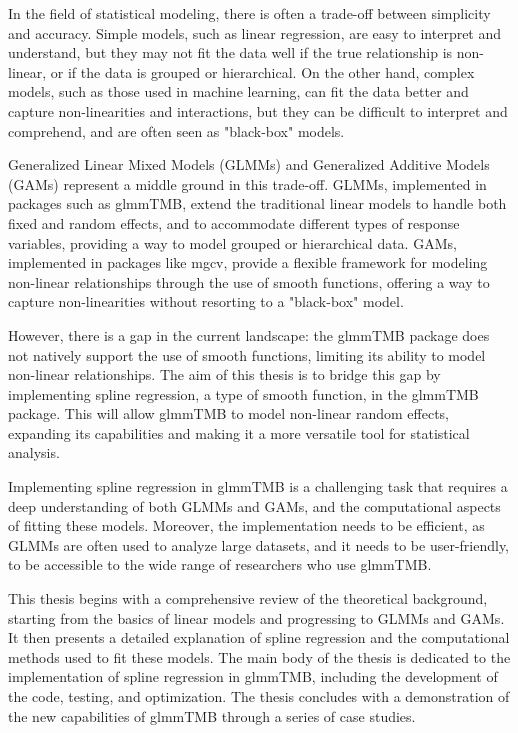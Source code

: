 \documentclass[12pt, twoside,hidelinks]{article}
\theoremstyle{definition}
\numberwithin{equation}{section}
\begin{document}
In the field of statistical modeling, there is often a trade-off between simplicity and accuracy. Simple models, such as linear regression, are easy to interpret and understand, but they may not fit the data well if the true relationship is non-linear, or if the data is grouped or hierarchical. On the other hand, complex models, such as those used in machine learning, can fit the data better and capture non-linearities and interactions, but they can be difficult to interpret and comprehend, and are often seen as "black-box" models.
\newline

Generalized Linear Mixed Models (GLMMs) and Generalized Additive Models (GAMs) represent a middle ground in this trade-off. GLMMs, implemented in packages such as glmmTMB, extend the traditional linear models to handle both fixed and random effects, and to accommodate different types of response variables, providing a way to model grouped or hierarchical data. GAMs, implemented in packages like mgcv, provide a flexible framework for modeling non-linear relationships through the use of smooth functions, offering a way to capture non-linearities without resorting to a "black-box" model.
\newline

However, there is a gap in the current landscape: the glmmTMB package does not natively support the use of smooth functions, limiting its ability to model non-linear relationships. The aim of this thesis is to bridge this gap by implementing spline regression, a type of smooth function, in the glmmTMB package. This will allow glmmTMB to model non-linear random effects, expanding its capabilities and making it a more versatile tool for statistical analysis.
\newline

Implementing spline regression in glmmTMB is a challenging task that requires a deep understanding of both GLMMs and GAMs, and the computational aspects of fitting these models. Moreover, the implementation needs to be efficient, as GLMMs are often used to analyze large datasets, and it needs to be user-friendly, to be accessible to the wide range of researchers who use glmmTMB.
\newline

This thesis begins with a comprehensive review of the theoretical background, starting from the basics of linear models and progressing to GLMMs and GAMs. It then presents a detailed explanation of spline regression and the computational methods used to fit these models. The main body of the thesis is dedicated to the implementation of spline regression in glmmTMB, including the development of the code, testing, and optimization. The thesis concludes with a demonstration of the new capabilities of glmmTMB through a series of case studies.
\newline
\end{document}

